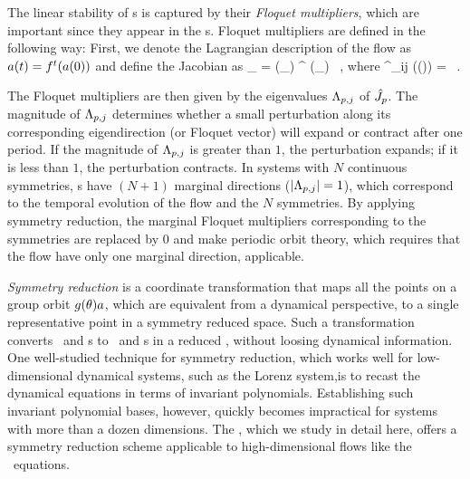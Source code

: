 The linear stability of \rpo s is captured by their \emph{Floquet multipliers},
which are important since they appear in the \cycForm s. Floquet multipliers are
defined in the following way: First, we denote the Lagrangian description of the flow as
$a(t) = {f^{t}(a(0))}$ and define the Jacobian as
\beq
\jMpsRed_{\rpprime} = \LieEl (\theta_\rpprime ) \jMps^\period{\rpprime} (\ssp_\rpprime)
\, , \mbox{where}\quad
\jMps^{\zeit}_{ij} (\ssp(\zeit)) = \, .

The Floquet multipliers are then given by the eigenvalues $\Lambda_{p,j}$ of $\hat{J}_{p}$.
The magnitude of $\Lambda_{p,j}$ determines whether a small perturbation along its corresponding
eigendirection (or Floquet vector) will expand or contract after one period. If the magnitude of
$\Lambda_{p,j}$ is greater than $1$, the perturbation expands; if it is less than $1$, the perturbation
contracts. In systems with $N$ continuous symmetries, \rpo s  have $(N+1)$ marginal directions ($\left|\Lambda_{p,j}\right| = 1$),
which correspond to the temporal evolution of the flow and the $N$ symmetries. By applying symmetry reduction,
the marginal Floquet multipliers corresponding to the symmetries are replaced by $0$ and make periodic orbit
theory, which requires that the flow have only one marginal direction, applicable.

\emph{Symmetry reduction} is a coordinate transformation that maps
all the points on a group orbit $g (\theta) a$, which are
equivalent from a dynamical perspective, to a single representative point in a symmetry reduced space.
Such a transformation converts \reqva\ and \rpo s to \eqva\ and \po s in a
reduced \statesp , without loosing dynamical information. One well-studied
technique for symmetry reduction, which works well for low-dimensional
dynamical systems, such as the Lorenz system,is to recast the dynamical equations in terms of invariant polynomials.
Establishing such invariant polynomial bases, however, quickly becomes
impractical for systems with more than a dozen dimensions.
The \mslices {},
which we study in detail here, offers a symmetry reduction scheme applicable to
high-dimensional flows like the \NS\ equations.

\subsection{\Mslices}
\label{s-slice}


